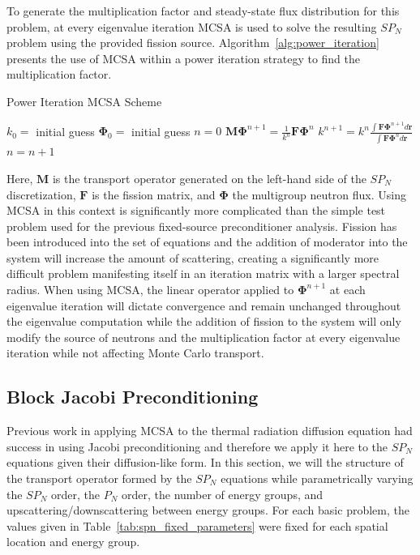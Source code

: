 To generate the multiplication factor and steady-state flux
distribution for this problem, at every eigenvalue iteration MCSA is
used to solve the resulting $SP_N$ problem using the provided fission
source. Algorithm~\ref{alg:power_iteration} presents the use of MCSA
within a power iteration strategy to find the multiplication factor.
\begin{algorithm}[h!]
  \caption{Power Iteration MCSA Scheme}
  \label{alg:power_iteration}
  \begin{algorithmic}
    \State $k_0 =$ initial guess
    \State $\mathbf{\Phi}_0 =$ initial guess
    \State $n = 0$
    \State $\mathbf{M} \mathbf{\Phi}^{n+1} = \frac{1}{k^n} \mathbf{F} \mathbf{\Phi}^n$
    \State $k^{n+1} = k^n \frac{\int \mathbf{F} \mathbf{\Phi}^{n+1} d\mathbf{r}}{\int
      \mathbf{F} \mathbf{\Phi}^n d\mathbf{r}}$
    \State $n = n+1$
    \EndWhile
  \end{algorithmic}
\end{algorithm}
Here, $\mathbf{M}$ is the transport operator generated on the
left-hand side of the $SP_N$ discretization, $\mathbf{F}$ is the
fission matrix, and $\mathbf{\Phi}$ the multigroup neutron flux. Using
MCSA in this context is significantly more complicated than the simple
test problem used for the previous fixed-source preconditioner
analysis. Fission has been introduced into the set of equations and
the addition of moderator into the system will increase the amount of
scattering, creating a significantly more difficult problem
manifesting itself in an iteration matrix with a larger spectral
radius. When using MCSA, the linear operator applied to
$\mathbf{\Phi}^{n+1}$ at each eigenvalue iteration will dictate
convergence and remain unchanged throughout the eigenvalue computation
while the addition of fission to the system will only modify the
source of neutrons and the multiplication factor at every eigenvalue
iteration while not affecting Monte Carlo transport.
 
\subsection{Block Jacobi Preconditioning}
\label{subsec:spn_spectral_analysis}
Previous work in applying MCSA to the thermal radiation diffusion
equation had success in using Jacobi preconditioning
\cite{evans_monte_2012} and therefore we apply it here to the $SP_N$
equations given their diffusion-like form. In this section, we will
the structure of the transport operator formed by the $SP_N$ equations
while parametrically varying the $SP_N$ order, the $P_N$ order, the
number of energy groups, and upscattering/downscattering between
energy groups. For each basic problem, the values given in
Table~\ref{tab:spn_fixed_parameters} were fixed for each spatial
location and energy group.


